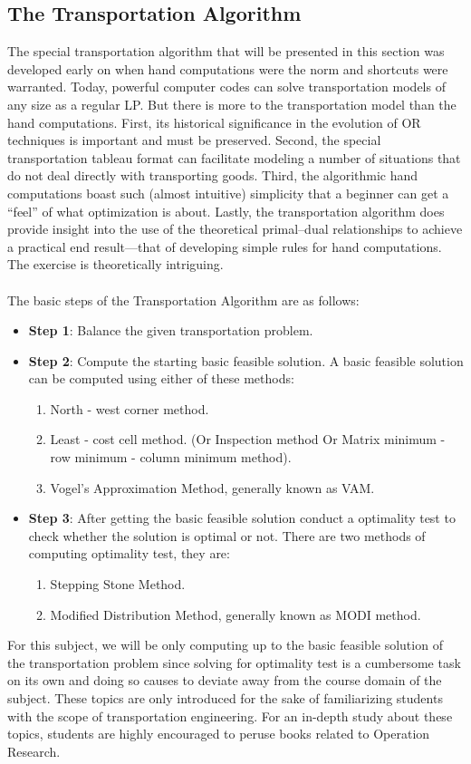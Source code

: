 \subsection{The Transportation Algorithm}
The special transportation algorithm that will be presented in this section was developed early on when hand computations were the norm and shortcuts were warranted. Today, powerful computer codes can solve transportation models of any size as a regular LP. But there is more to the transportation model than the hand computations. First, its historical significance in the evolution of OR techniques is important and must be preserved. Second, the special transportation tableau format can facilitate modeling a number of situations that do not deal directly with transporting goods. Third, the algorithmic hand computations boast such (almost intuitive) simplicity that a beginner can get a “feel” of what optimization is about. Lastly, the transportation algorithm does provide insight into the use of the theoretical primal–dual relationships to achieve a practical end result—that of developing simple rules for hand computations. The exercise is theoretically intriguing.\\\\
The basic steps of the Transportation Algorithm are as follows:
\begin{itemize}
	\item \textbf{Step 1}: Balance the given transportation problem.
	\item \textbf{Step 2}: Compute the starting basic feasible solution. A basic feasible solution can be computed using either of these methods:
	\begin{enumerate}
		\item North - west corner method.
		\item Least - cost cell method. (Or Inspection method Or Matrix minimum - row minimum - column minimum method).
		\item Vogel's Approximation Method, generally known as VAM.
	\end{enumerate}
	\item \textbf{Step 3}: After getting the basic feasible solution conduct a optimality test to check whether the solution is optimal or not. There are two methods of computing optimality test, they are:
	\begin{enumerate}
		\item Stepping Stone Method.
		\item Modified Distribution Method, generally known as MODI method.
	\end{enumerate}
\end{itemize}
For this subject, we will be only computing up to the basic feasible solution of the transportation problem since solving for optimality test is a cumbersome task on its own and doing so causes to deviate away from the course domain of the subject. These topics are only introduced for the sake of familiarizing students with the scope of transportation engineering. For an in-depth study about these topics, students are highly encouraged to peruse books related to Operation Research.
%
